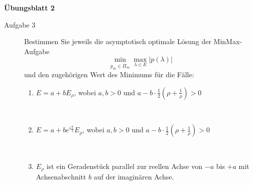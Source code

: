 \documentclass[a4paper,11pt]{scrartcl}
\begin{document}
\aihead

\begin{center}
  {\large\textbf{Übungsblatt 2}}
\end{center}


\begin{description}
    \item[Aufgabe 3] Bestimmen Sie jeweils die asymptotisch optimale Lösung der MinMax-Aufgabe 
    \begin{equation*}
    \min_{p_m \in \overline{\Pi}_m} \max_{\lambda \in E}|p(\lambda)|
    \end{equation*}
    und den zugehörigen Wert des Minimums für die Fälle:
    \begin{enumerate}
    \item $E = a+bE_\rho$, wobei $a,b > 0$ und $a-b\cdot\frac{1}{2}(\rho + \frac{1}{\rho}) > 0$\\
\\

\item $E = a + b e^{i\frac{\pi}{2}}E_\rho$, wobei $a,b > 0$ und $a-b\cdot\frac{1}{2}(\rho + \frac{1}{\rho}) > 0$\\
\\

\item $E_\rho$ ist ein Geradenstück parallel zur reellen Achse von $-a$ bis $+a$ mit Achsenabschnitt $b$ auf der imaginären Achse.\\
\\


    \end{enumerate}
\end{description}
\end{document}
